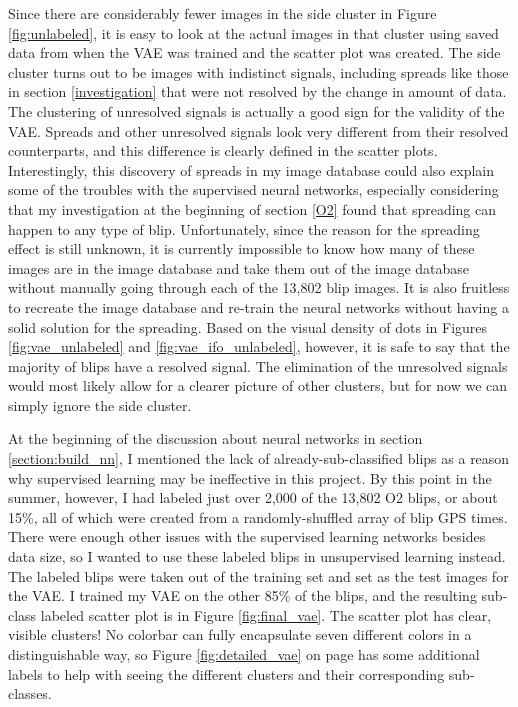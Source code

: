 \documentclass[a4paper]{article}
\begin{document}
Since there are considerably fewer images in the side cluster in Figure \ref{fig:unlabeled}, it is easy to look at the actual images in that cluster using saved data from when the VAE was trained and the scatter plot was created. The side cluster turns out to be images with indistinct signals, including spreads like those in section \ref{investigation} that were not resolved by the change in amount of data. The clustering of unresolved signals is actually a good sign for the validity of the VAE. Spreads and other unresolved signals look very different from their resolved counterparts, and this difference is clearly defined in the scatter plots. Interestingly, this discovery of spreads in my image database could also explain some of the troubles with the supervised neural networks, especially considering that my investigation at the beginning of section \ref{O2} found that spreading can happen to any type of blip. Unfortunately, since the reason for the spreading effect is still unknown, it is currently impossible to know how many of these images are in the image database and take them out of the image database without manually going through each of the 13,802 blip images. It is also fruitless to recreate the image database and re-train the neural networks without having a solid solution for the spreading. Based on the visual density of dots in Figures \ref{fig:vae_unlabeled} and \ref{fig:vae_ifo_unlabeled}, however, it is safe to say that the majority of blips have a resolved signal. The elimination of the unresolved signals would most likely allow for a clearer picture of other clusters, but for now we can simply ignore the side cluster. 

At the beginning of the discussion about neural networks in section \ref{section:build_nn}, I mentioned the lack of already-sub-classified blips as a reason why supervised learning may be ineffective in this project. By this point in the summer, however, I had labeled just over 2,000 of the 13,802 O2 blips, or about 15\%, all of which were created from a randomly-shuffled array of blip GPS times. There were enough other issues with the supervised learning networks besides data size, so I wanted to use these labeled blips in unsupervised learning instead. The labeled blips were taken out of the training set and set as the test images for the VAE. I trained my VAE on the other 85\% of the blips, and the resulting sub-class labeled scatter plot is in Figure \ref{fig:final_vae}. The scatter plot has clear, visible clusters! No colorbar can fully encapsulate seven different colors in a distinguishable way, so Figure \ref{fig:detailed_vae} on page \pageref{fig:detailed_vae} has some additional labels to help with seeing the different clusters and their corresponding sub-classes. 
\end{document}
